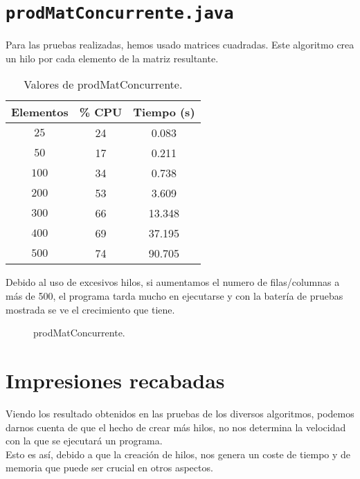 \documentclass[12pt,letterpaper]{article}
\begin{document}
\section{\texttt{prodMatConcurrente.java}}
\noindent
Para las pruebas realizadas, hemos usado matrices cuadradas. Este algoritmo crea un hilo por cada elemento de la matriz resultante.
\begin{center}
	\begin{table}[htbp]
		\begin{center}
			\begin{tabular}{|c|c|c|}
				\hline
				\textbf{Elementos} & \textbf{\% CPU} & \textbf{Tiempo (s)}  \\
				\hline 
				$25$ & 24 & 0.083\\ \hline
				$50$ & 17 & 0.211\\ \hline
				$100$ & 34 & 0.738\\ \hline	
				$200$ & 53 & 3.609 \\ \hline 
				$300$ & 66 & 13.348 \\ \hline 
				$400$ & 69 & 37.195 \\ \hline 
				$500$ & 74 & 90.705\\ \hline
			\end{tabular}
			\caption{Valores de prodMatConcurrente.}
			\label{tabla:Valores de prodMatConcurrente}
		\end{center}
	\end{table}
\end{center}
\noindent
Debido al uso de excesivos hilos, si aumentamos el numero de filas/columnas a más de 500, el programa tarda mucho en ejecutarse y con la batería de pruebas mostrada se ve el crecimiento que tiene.
\begin{figure}
	\begin{center}
		\caption{prodMatConcurrente.}
		\label{fig: prodMatConcurrente}
	\end{center}	
\end{figure}

\newpage
\section{Impresiones recabadas}
\noindent
Viendo los resultado obtenidos en las pruebas de los diversos algoritmos, podemos darnos cuenta de que el hecho de crear más hilos, no nos determina la velocidad con la que se ejecutará un programa.\\
Esto es así, debido a que la creación de hilos, nos genera un coste de tiempo y de memoria que puede ser crucial en otros aspectos.
\end{document}
